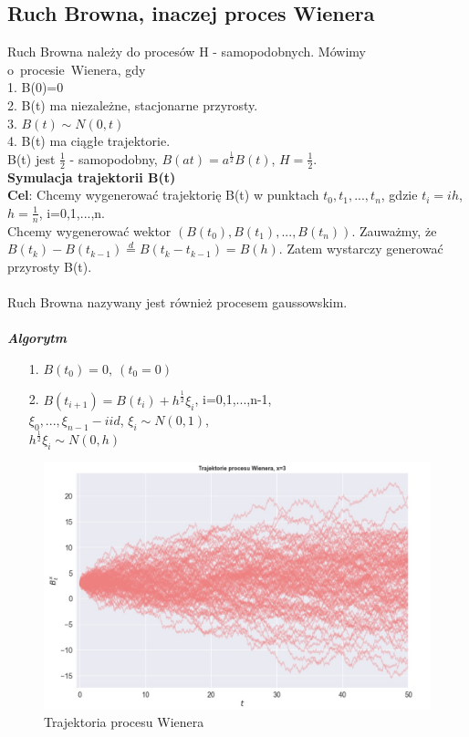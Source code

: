 \documentclass[12pt]{mwart}
\begin{document}
	\subsection{Ruch Browna, inaczej proces Wienera}
	\noindent Ruch Browna należy do procesów H - samopodobnych. Mówimy o~procesie~Wienera, gdy\\
	1. B(0)=0\\
	2. B(t) ma niezależne, stacjonarne przyrosty.\\
	3. $B(t) \sim N(0,t)$\\
	4. B(t) ma ciągłe trajektorie.\\
	B(t) jest $\frac{1}{2}$ - samopodobny, $B(at)=a^{\frac{1}{2}}B(t)$, $H=\frac{1}{2}$.\\
	\newline
	\noindent\textbf{Symulacja trajektorii B(t)}\\
	\noindent\textbf{Cel}: Chcemy wygenerować trajektorię B(t) w punktach $t_0, t_1,...,t_n$, gdzie $t_i=ih$, $h=\frac{1}{n}$, i=0,1,...,n.\\ Chcemy wygenerować wektor $(B(t_0),B(t_1),...,B(t_n))$. Zauważmy, że \\ $B(t_k)-B(t_{k-1})\stackrel{d}=B(t_k-t_{k-1})=B(h)$. Zatem wystarczy generować przyrosty B(t).\\
	\\
	Ruch Browna nazywany jest również procesem gaussowskim. \\ \\
	\noindent\textbf{\textit{Algorytm}}
	\begin{enumerate}
		\item[1.] $B(t_0)=0,\ (t_0=0)$
		\item[2.] $B(t_{i+1})=B(t_i)+h^{\frac{1}{2}} \xi_i$, i=0,1,...,n-1,\\ $\xi_0,...,\xi_{n-1} - iid$, $\xi_i \sim N(0,1)$, \\$h^{\frac{1}{2}}\xi_i \sim N(0,h)$
	\end{enumerate}
	
		\begin{figure}[H]
		\begin{center}
			\includegraphics[scale=0.4]{trajektoria.jpg}
			\caption{Trajektoria procesu Wienera}
		\end{center}
	\end{figure}
	
\end{document}
